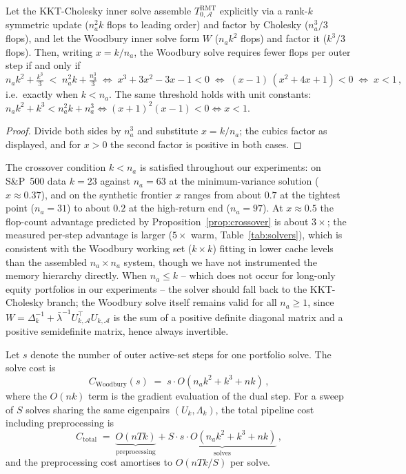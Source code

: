 \begin{proposition}\label{prop:crossover}
Let the KKT-Cholesky inner solve assemble
$T_{0,\mathcal{A}}^{\mathrm{RMT}}$ explicitly via a rank-$k$ symmetric update
($n_a^2 k$ flops to leading order) and factor by Cholesky ($n_a^3/3$ flops),
and let the Woodbury inner solve form $W$ ($n_a k^2$ flops) and factor it
($k^3/3$ flops). Then, writing $x = k/n_a$, the Woodbury solve requires fewer
flops per outer step if and only if
\[
  n_a k^2 + \tfrac{k^3}{3} \;<\; n_a^2 k + \tfrac{n_a^3}{3}
  \;\iff\;
  x^3 + 3x^2 - 3x - 1 < 0
  \;\iff\;
  (x - 1)\,(x^2 + 4x + 1) < 0
  \;\iff\;
  x < 1\,,
\]
i.e.\ exactly when $k < n_a$. The same threshold holds with unit constants:
$n_a k^2 + k^3 < n_a^2 k + n_a^3 \iff (x+1)^2(x-1) < 0 \iff x < 1$.
\end{proposition}

\begin{proof}
Divide both sides by $n_a^3$ and substitute $x = k/n_a$; the cubics factor as
displayed, and for $x > 0$ the second factor is positive in both cases.
\end{proof}

\begin{remark}\label{rem:crossover}
The crossover condition $k < n_a$ is satisfied throughout our experiments:
on S\&P~500 data $k = 23$ against $n_a = 63$ at the minimum-variance solution
($x \approx 0.37$), and on the synthetic frontier $x$ ranges from about $0.7$
at the tightest point ($n_a = 31$) to about $0.2$ at the high-return end
($n_a = 97$). At $x \approx 0.5$ the flop-count advantage predicted by
Proposition~\ref{prop:crossover} is about $3\times$; the measured per-step
advantage is larger ($5\times$ warm, Table~\ref{tab:solvers}), which is
consistent with the Woodbury working set ($k \times k$) fitting in
lower cache levels than the assembled $n_a \times n_a$ system, though we have
not instrumented the memory hierarchy directly. When $n_a \leq k$ -- which
does not occur for long-only equity portfolios in our experiments -- the
solver should fall back to the KKT-Cholesky branch; the Woodbury solve itself
remains valid for all $n_a \geq 1$, since
$W = \Delta_k^{-1} + \bar\lambda^{-1}U_{k,\mathcal{A}}^\top U_{k,\mathcal{A}}$
is the sum of a positive definite diagonal matrix and a positive semidefinite
matrix, hence always invertible.
\end{remark}

\begin{proposition}\label{prop:pipeline}
Let $s$ denote the number of outer active-set steps for one portfolio solve.
The solve cost is
\[
  C_{\mathrm{Woodbury}}(s) \;=\; s \cdot O(n_a k^2 + k^3 + nk)\,,
\]
where the $O(nk)$ term is the gradient evaluation of the dual step.
For a sweep of $S$ solves sharing the same eigenpairs $(U_k, \Lambda_k)$,
the total pipeline cost including preprocessing is
\[
  C_{\mathrm{total}} \;=\; \underbrace{O(nTk)}_{\text{preprocessing}} +
  \underbrace{S \cdot s \cdot O(n_a k^2 + k^3 + nk)}_{\text{solves}}\,,
\]
and the preprocessing cost amortises to $O(nTk/S)$ per solve.
\end{proposition}

